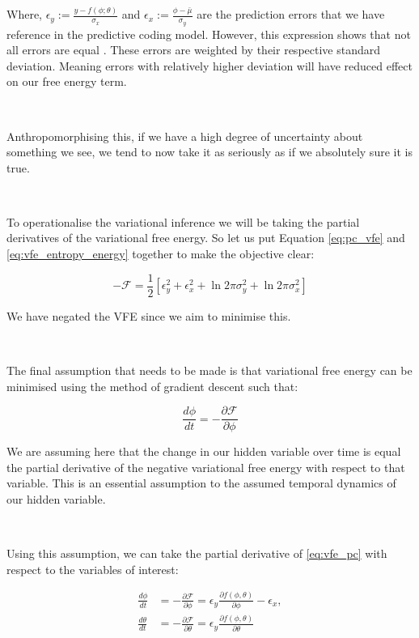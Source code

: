 \documentclass{article}
\begin{document}
Where, $\epsilon_y := \frac{y - f(\phi; \theta)}{\sigma_x}$ and $\epsilon_x := \frac{\phi - \bar{\mu}}{\sigma_y}$ are the prediction errors that we have reference in the predictive coding model. However, this expression shows that not all errors are equal \citep{hodson2023empirical}. These errors are weighted by their respective standard deviation. Meaning errors with relatively higher deviation will have reduced effect on our free energy term. 

\

Anthropomorphising this, if we have a high degree of uncertainty about something we see, we tend to now take it as seriously as if we absolutely sure it is true.

\

To operationalise the variational inference we will be taking the partial derivatives of the variational free energy. So let us put Equation \ref{eq:pc_vfe} and \ref{eq:vfe_entropy_energy} together to make the objective clear:

\begin{equation}\label{eq:vfe_pc}
	-\mathcal{F} = \frac{1}{2}\left[ \epsilon_y^2 + \epsilon_x^2 +\ln 2 \pi \sigma^2_y +\ln 2 \pi \sigma^2_x  \right]
\end{equation}

We have negated the VFE since we aim to minimise this. 

\

The final assumption that needs to be made is that variational free energy can be minimised using the method of gradient descent such that:

\begin{equation}
	\frac{d \phi}{dt} = -\frac{\partial \mathcal{F}}{\partial \phi}
\end{equation}

We are assuming here that the change in our hidden variable over time is equal the partial derivative of the negative variational free energy with respect to that variable. This is an essential assumption to the assumed temporal dynamics of our hidden variable. 

\

Using this assumption, we can take the partial derivative of \ref{eq:vfe_pc} with respect to the variables of interest:

\begin{equation}\label{eq:pc_update_equations}
	\begin{aligned}
		\frac{d \phi}{dt} &= -\frac{\partial \mathcal{F}}{\partial \phi} = \epsilon_y \frac{\partial f(\phi, \theta)}{\partial \phi} - \epsilon_x, \\
    \frac{d \theta}{dt} &= - \frac{\partial \mathcal{F}}{\partial \theta}  = \epsilon_y \frac{\partial f(\phi, \theta)}{\partial \theta}
    \end{aligned}
\end{equation}
\end{document}
